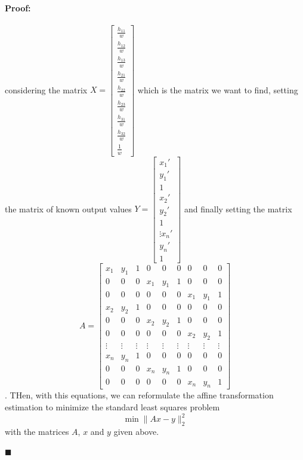 \documentclass[12pt]{article}
\newenvironment{proof}{\paragraph{Proof: }}{\hfill$\blacksquare$}
\begin{document}
\begin{proof}
\begin{enumerate}
considering the matrix $X = \left[ \begin{matrix} \frac{h_{11}}{w}\\ \frac{h_{12}}{w} \\ \frac{h_{13}}{w} \\ \frac{h_{21}}{w} \\ \frac{h_{22}}{w} \\ \frac{h_{23}}{w} \\ \frac{h_{31}}{w} \\ \frac{h_{32}}{w} \\ \frac{1}{w}\end{matrix} \right]$ which is the matrix we want to find, setting the matrix of known output values $Y = \left[ \begin{matrix} x_1' \\ y_1' \\ 1 \\ x_2' \\ y_2' \\ 1 \\ \vdots x_n' \\ y_n' \\ 1 \end{matrix} \right]$ and finally setting the matrix $$A = \left[\begin{matrix} x_1 & y_1 & 1 & 0 & 0& 0 & 0 & 0 & 0 \\ 0 & 0 & 0 & x_1 & y_1 & 1 & 0 & 0 & 0 \\ 0 & 0& 0 & 0 & 0 & 0 & x_1 & y_1 & 1 \\ x_2 & y_2 & 1 & 0 & 0& 0 & 0 & 0 & 0 \\ 0 & 0 & 0 & x_2 & y_2 & 1 & 0 & 0 & 0 \\ 0 & 0& 0 & 0 & 0 & 0 & x_2 & y_2 & 1 \\ \vdots & \vdots & \vdots & \vdots & \vdots & \vdots & \vdots & \vdots & \vdots \\ x_n & y_n & 1 & 0 & 0& 0 & 0 & 0 & 0 \\ 0 & 0 & 0 & x_n & y_n & 1 & 0 & 0 & 0 \\ 0 & 0& 0 & 0 & 0 & 0 & x_n & y_n & 1\end{matrix}\right]$$. THen, with this equations, we can reformulate the affine transformation estimation to minimize the standard least squares problem $$\min \|Ax - y\|_2^2$$ with the matrices $A$, $x$ and $y$ given above. \\


\end{enumerate}
\end{proof}
\end{document}
